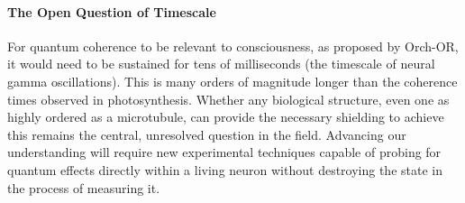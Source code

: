 \paragraph{The Open Question of Timescale}
For quantum coherence to be relevant to consciousness, as proposed by Orch-OR, it would need to be sustained for tens of milliseconds (the timescale of neural gamma oscillations). This is many orders of magnitude longer than the coherence times observed in photosynthesis. Whether any biological structure, even one as highly ordered as a microtubule, can provide the necessary shielding to achieve this remains the central, unresolved question in the field. Advancing our understanding will require new experimental techniques capable of probing for quantum effects directly within a living neuron without destroying the state in the process of measuring it.
\begin{importantbox}

\end{importantbox}
